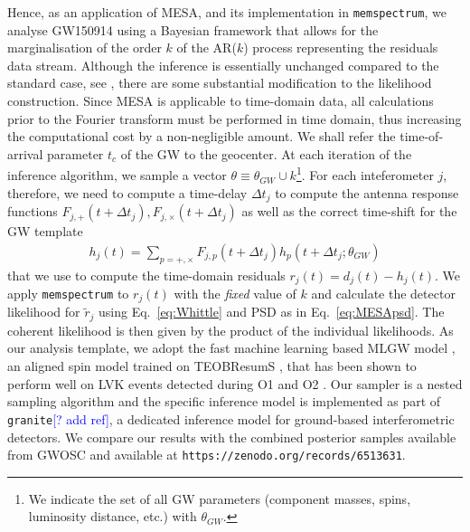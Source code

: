 \documentclass{aa}
\begin{document}
Hence, as an application of MESA, and its implementation in \texttt{memspectrum}, we analyse GW150914\cite{} using a Bayesian framework that allows for the marginalisation of the order  $k$ of the AR($k$) process representing the residuals data stream. Although the inference is essentially unchanged compared to the standard case, see \cite{lalinference}, there are some substantial modification to the likelihood construction. Since MESA is applicable to time-domain data, all calculations prior to the Fourier transform must be performed in time domain, thus increasing the computational cost by a non-negligible amount. We shall refer the time-of-arrival parameter $t_c$ of the GW to the geocenter. At each iteration of the inference algorithm, we sample a vector $\theta\equiv\theta_{GW}\cup k$\footnote{We indicate the set of all GW parameters (component masses, spins, luminosity distance, etc.) with $\theta_{GW}$.}. For each inteferometer $j$, therefore, we need to compute a time-delay $\Delta t_j$ to compute the antenna response functions $F_{j,+}(t+\Delta t_j),F_{j,\times}(t+\Delta t_j)$ as well as the correct time-shift for the GW template 
\begin{align}
h_j(t) =\sum_{p = +,\times}F_{j,p}(t+\Delta t_j)h_{p}(t+\Delta t_j;\theta_{GW})
\end{align}
that we use to compute the time-domain residuals $r_j(t) = d_j(t) - h_j(t)$. We apply \texttt{memspectrum} to $r_j(t)$ with the \emph{fixed} value of $k$ and calculate the detector likelihood for $\tilde{r}_j$ using Eq.~\eqref{eq:Whittle} and PSD as in Eq.~\eqref{eq:MESApsd}. The coherent likelihood is then given by the product of the individual likelihoods. As our analysis template, we adopt the fast machine learning based MLGW model \cite{MLGW}, an aligned spin model trained on TEOBResumS \cite{teobresums}, that has been shown to perform well on LVK events detected during O1 and O2 \cite{MLGW}. Our sampler is a nested sampling algorithm \cite{john_veitch_2020_4109277} and the specific inference model is implemented as part of \texttt{granite}\textcolor{blue}{[? add ref]}, a dedicated inference model for ground-based interferometric detectors. We compare our results with the combined posterior samples available from GWOSC \cite{GWOSC} and available at \texttt{https://zenodo.org/records/6513631}.
\end{document}
